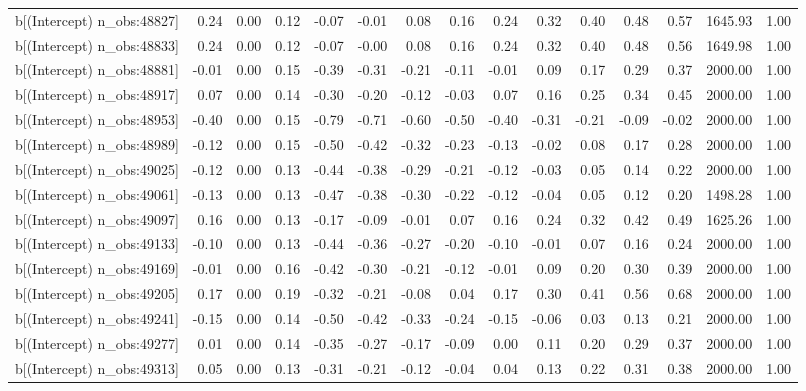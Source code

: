 \begin{table}[ht]
\begin{tabular}{rrrrrrrrrrrrrrr}
  b[(Intercept) n\_obs:48827] & 0.24 & 0.00 & 0.12 & -0.07 & -0.01 & 0.08 & 0.16 & 0.24 & 0.32 & 0.40 & 0.48 & 0.57 & 1645.93 & 1.00 \\ 
  b[(Intercept) n\_obs:48833] & 0.24 & 0.00 & 0.12 & -0.07 & -0.00 & 0.08 & 0.16 & 0.24 & 0.32 & 0.40 & 0.48 & 0.56 & 1649.98 & 1.00 \\ 
  b[(Intercept) n\_obs:48881] & -0.01 & 0.00 & 0.15 & -0.39 & -0.31 & -0.21 & -0.11 & -0.01 & 0.09 & 0.17 & 0.29 & 0.37 & 2000.00 & 1.00 \\ 
  b[(Intercept) n\_obs:48917] & 0.07 & 0.00 & 0.14 & -0.30 & -0.20 & -0.12 & -0.03 & 0.07 & 0.16 & 0.25 & 0.34 & 0.45 & 2000.00 & 1.00 \\ 
  b[(Intercept) n\_obs:48953] & -0.40 & 0.00 & 0.15 & -0.79 & -0.71 & -0.60 & -0.50 & -0.40 & -0.31 & -0.21 & -0.09 & -0.02 & 2000.00 & 1.00 \\ 
  b[(Intercept) n\_obs:48989] & -0.12 & 0.00 & 0.15 & -0.50 & -0.42 & -0.32 & -0.23 & -0.13 & -0.02 & 0.08 & 0.17 & 0.28 & 2000.00 & 1.00 \\ 
  b[(Intercept) n\_obs:49025] & -0.12 & 0.00 & 0.13 & -0.44 & -0.38 & -0.29 & -0.21 & -0.12 & -0.03 & 0.05 & 0.14 & 0.22 & 2000.00 & 1.00 \\ 
  b[(Intercept) n\_obs:49061] & -0.13 & 0.00 & 0.13 & -0.47 & -0.38 & -0.30 & -0.22 & -0.12 & -0.04 & 0.05 & 0.12 & 0.20 & 1498.28 & 1.00 \\ 
  b[(Intercept) n\_obs:49097] & 0.16 & 0.00 & 0.13 & -0.17 & -0.09 & -0.01 & 0.07 & 0.16 & 0.24 & 0.32 & 0.42 & 0.49 & 1625.26 & 1.00 \\ 
  b[(Intercept) n\_obs:49133] & -0.10 & 0.00 & 0.13 & -0.44 & -0.36 & -0.27 & -0.20 & -0.10 & -0.01 & 0.07 & 0.16 & 0.24 & 2000.00 & 1.00 \\ 
  b[(Intercept) n\_obs:49169] & -0.01 & 0.00 & 0.16 & -0.42 & -0.30 & -0.21 & -0.12 & -0.01 & 0.09 & 0.20 & 0.30 & 0.39 & 2000.00 & 1.00 \\ 
  b[(Intercept) n\_obs:49205] & 0.17 & 0.00 & 0.19 & -0.32 & -0.21 & -0.08 & 0.04 & 0.17 & 0.30 & 0.41 & 0.56 & 0.68 & 2000.00 & 1.00 \\ 
  b[(Intercept) n\_obs:49241] & -0.15 & 0.00 & 0.14 & -0.50 & -0.42 & -0.33 & -0.24 & -0.15 & -0.06 & 0.03 & 0.13 & 0.21 & 2000.00 & 1.00 \\ 
  b[(Intercept) n\_obs:49277] & 0.01 & 0.00 & 0.14 & -0.35 & -0.27 & -0.17 & -0.09 & 0.00 & 0.11 & 0.20 & 0.29 & 0.37 & 2000.00 & 1.00 \\ 
  b[(Intercept) n\_obs:49313] & 0.05 & 0.00 & 0.13 & -0.31 & -0.21 & -0.12 & -0.04 & 0.04 & 0.13 & 0.22 & 0.31 & 0.38 & 2000.00 & 1.00 \\ 

\end{tabular}
\end{table}
